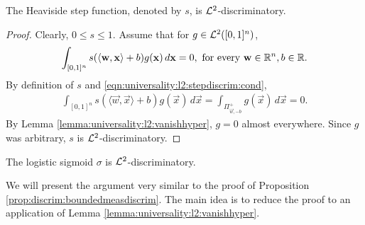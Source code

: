 \begin{lemma} The Heaviside step function, denoted by $s$, is ${\mathcal {L}^2}$-discriminatory.
\label{lemma:universality:l2:stepdiscrim}
\end{lemma}
\begin{proof}
Clearly, $0 \leq s \leq 1$.
Assume that for $g \in {\mathcal {L}^2}([0,1]^n)$, \begin{align}
        \label{eqn:universality:l2:stepdiscrim:cond}
        \int_{[0,1]^n} s(\langle \mathbf{w}, \mathbf{x} \rangle + b) g(\mathbf{x}) \, d\mathbf{x} = 0, \text{ for every $\mathbf{w} \in {\mathbb R}^n, b \in {\mathbb R}$}.
\end{align}
By definition of $s$ and \ref{eqn:universality:l2:stepdiscrim:cond}, \begin{align*}
    \int_{[0,1]^n}s(\langle \vec{w}, \vec{x} \rangle + b) g(\vec{x}) \, d\vec{x} = \int_{\Pi_{\vec{w}, -b}^{+}} g(\vec{x})\, d\vec{x} = 0.
\end{align*}
By Lemma \ref{lemma:universality:l2:vanishhyper}, $g = 0$ almost everywhere. Since $g$ was arbitrary, $s$ is ${\mathcal {L}^2}$-discriminatory.
\end{proof}
\begin{lemma} The logistic sigmoid $\sigma$ is ${\mathcal {L}^2}$-discriminatory.
\label{lemma:universality:l2:sigmoiddiscrim}
\end{lemma}
\begin{proof-idea*}
We will present the argument very similar to the proof of Proposition \ref{prop:discrim:boundedmeasdiscrim}.
The main idea is to reduce the proof to an application of Lemma \ref{lemma:universality:l2:vanishhyper}. 
\end{proof-idea*}
